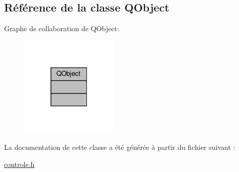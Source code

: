 \hypertarget{class_q_object}{}\subsection{Référence de la classe Q\+Object}
\label{class_q_object}


Graphe de collaboration de Q\+Object\+:
\nopagebreak
\begin{figure}[H]
\begin{center}
\leavevmode
\includegraphics[width=133pt]{class_q_object__coll__graph}
\end{center}
\end{figure}


La documentation de cette classe a été générée à partir du fichier suivant \+:\begin{DoxyCompactItemize}
\item 
\hyperlink{controle_8h}{controle.\+h}\end{DoxyCompactItemize}
